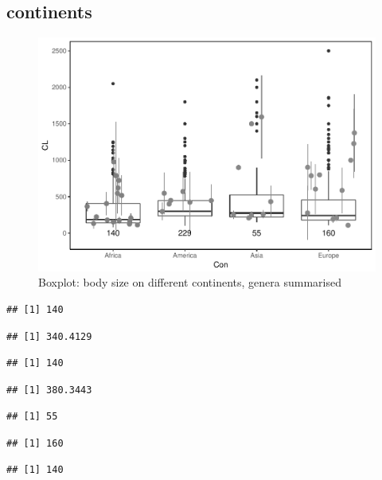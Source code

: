 \documentclass[]{article}
\begin{document}
\newpage

\subsection{continents}\label{continents-1}

\begin{figure}[htbp]
\centering
\includegraphics{MA_JJ_files/figure-latex/Boxplot body size split into continents-1.pdf}
\caption{Boxplot: body size on different continents, genera summarised}
\end{figure}

\begin{verbatim}
## [1] 140
\end{verbatim}

\begin{verbatim}
## [1] 340.4129
\end{verbatim}

\begin{verbatim}
## [1] 140
\end{verbatim}

\begin{verbatim}
## [1] 380.3443
\end{verbatim}

\begin{verbatim}
## [1] 55
\end{verbatim}

\begin{verbatim}
## [1] 160
\end{verbatim}

\begin{verbatim}
## [1] 140
\end{verbatim}
\end{document}
